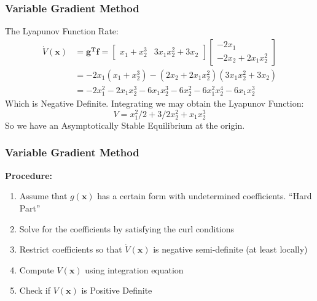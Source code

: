 \documentclass[11pt,handout]{beamer}   %
\begin{document}
\begin{frame}
\frametitle{Variable Gradient Method}
The Lyapunov Function Rate:\\
\begin{equation*}
\begin{split}
\dot{V}(\mathbf{x}) &= \mathbf{g^Tf} = \begin{bmatrix}
x_1 + x_2^3 & 3 x_1x_2^2 + 3x_2
\end{bmatrix}\begin{bmatrix}
-2x_1\\ -2x_2 + 2x_1x_2^2
\end{bmatrix}\\
&= -2x_1(x_1+x_2^3) - (2x_2+2x_1x_2^2)(3x_1x_2^2 + 3x_2)\\
&= -2x_1^2 -2x_1x_2^3 - 6x_1x_2^3 - 6x_2^2 - 6x_1^2x_2^4 - 6x_1x_2^3
\end{split}
\end{equation*}
Which is Negative Definite. Integrating we may obtain the Lyapunov Function:
\begin{equation*}
V = x_1^2/2 + 3/2 x_2^2 + x_1 x_2^3
\end{equation*}
So we have an Asymptotically Stable Equilibrium at the origin.
\end{frame}

\begin{frame}
\frametitle{Variable Gradient Method}
\textbf{Procedure:}
\begin{enumerate}
\item Assume that $g(\mathbf{x})$ has a certain form with undetermined coefficients. ``Hard Part''
\item Solve for the coefficients by satisfying the curl conditions
\item Restrict coefficients so that $\dot{V}(\mathbf{x})$ is negative semi-definite (at least locally)
\item Compute $V(\mathbf{x})$ using integration equation
\item Check if $V(\mathbf{x})$ is Positive Definite
\end{enumerate}
\end{frame}
\end{document}
